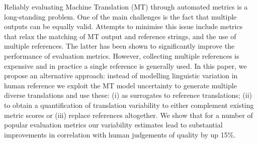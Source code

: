 Reliably evaluating Machine Translation (MT) through automated metrics is a long-standing problem. One of the main challenges is the fact that multiple outputs can be equally valid. Attempts to minimise this issue include metrics that relax the matching of MT output and reference strings, and the use of multiple references. The latter has been shown to significantly improve the performance of evaluation metrics. However, collecting multiple references is expensive and in practice a single reference is generally used. In this paper, we propose an alternative approach: instead of modelling linguistic variation in human reference we exploit the MT model uncertainty to generate multiple diverse translations and use these: (i) as surrogates to reference translations; (ii) to obtain a quantification of translation variability to either complement existing metric scores or (iii) replace references altogether. We show that for a number of popular evaluation metrics our variability estimates lead to substantial improvements in correlation with human judgements of quality by up 15\%.
